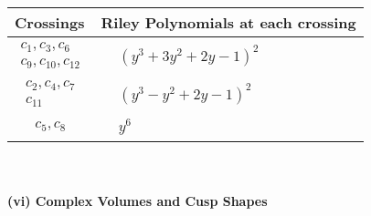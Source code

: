 \documentclass[1p]{elsarticle_modified}
\theoremstyle{definition}
\begin{document}
\begin{tabular}{m{50pt}|m{274pt}}
Crossings & \hspace{64pt}Riley Polynomials at each crossing \\
\hline $$\begin{aligned}c_{1},c_{3},c_{6}\\c_{9},c_{10},c_{12}\end{aligned}$$&$\begin{aligned}
&(y^3+3 y^2+2 y-1)^2
\end{aligned}$\\
\hline $$\begin{aligned}c_{2},c_{4},c_{7}\\c_{11}\end{aligned}$$&$\begin{aligned}
&(y^3- y^2+2 y-1)^2
\end{aligned}$\\
\hline $$\begin{aligned}c_{5},c_{8}\end{aligned}$$&$\begin{aligned}
&y^6
\end{aligned}$\\
\hline
\end{tabular}\\~\\
\newpage\flushleft \textbf{(vi) Complex Volumes and Cusp Shapes}
\end{document}
